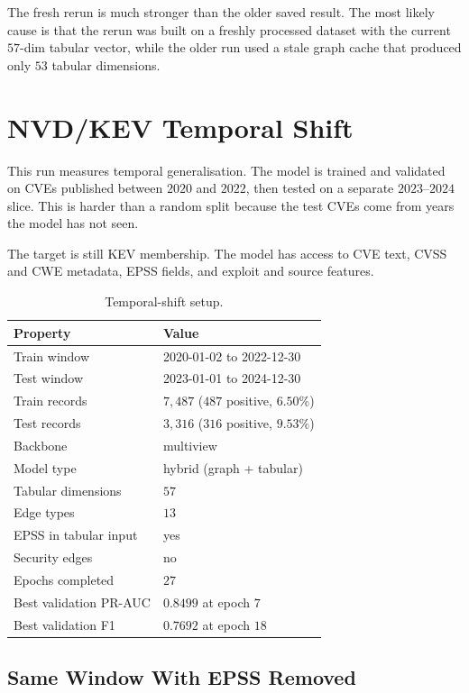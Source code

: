 \documentclass[11pt]{article}
\begin{document}
The fresh rerun is much stronger than the older saved result. The
most likely cause is that the rerun was built on a freshly processed
dataset with the current $57$-dim tabular vector, while the older run
used a stale graph cache that produced only $53$ tabular dimensions.

\section{NVD/KEV Temporal Shift}

This run measures temporal generalisation. The model is trained and
validated on CVEs published between $2020$ and $2022$, then tested on
a separate $2023$--$2024$ slice. This is harder than a random split
because the test CVEs come from years the model has not seen.

The target is still KEV membership. The model has access to CVE text,
CVSS and CWE metadata, EPSS fields, and exploit and source features.

\begin{table}[h]
\centering
\small
\begin{tabular}{ll}
\toprule
Property & Value \\
\midrule
Train window & 2020-01-02 to 2022-12-30 \\
Test window  & 2023-01-01 to 2024-12-30 \\
Train records & $7{,}487$ ($487$ positive, $6.50\%$) \\
Test records  & $3{,}316$ ($316$ positive, $9.53\%$) \\
Backbone & multiview \\
Model type & hybrid (graph + tabular) \\
Tabular dimensions & $57$ \\
Edge types & $13$ \\
EPSS in tabular input & yes \\
Security edges & no \\
Epochs completed & $27$ \\
Best validation PR-AUC & $0.8499$ at epoch $7$ \\
Best validation F1 & $0.7692$ at epoch $18$ \\
\bottomrule
\end{tabular}
\caption{Temporal-shift setup.}
\end{table}

\subsection{Same Window With EPSS Removed}
\end{document}

